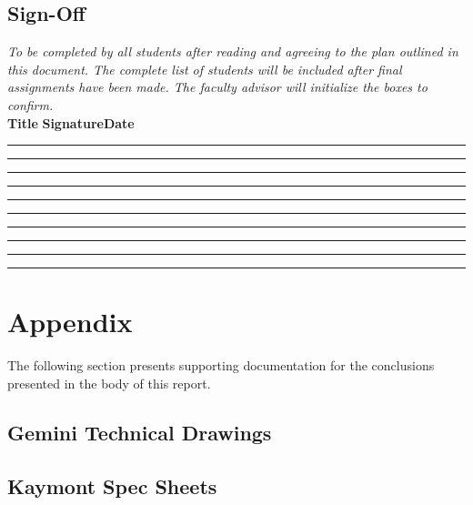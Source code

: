 \subsection{Sign-Off}
\textit{To be completed by all students after reading and agreeing to the plan outlined in this document. The complete list of students will be included after final assignments have been made. The faculty advisor will initialize the boxes to confirm.}
\vspace{.02cm}
\ \\

\textbf{Title} \tabto{20em}\textbf{Signature}\hspace{10em}\textbf{Date}
\begin{checklist}
    \item \pmgfull \tabto{20em}\rule{10em}{0.4pt}\hspace{5em}\rule{10em}{0.4pt}
    \item \tlfull  \tabto{20em}\rule{10em}{0.4pt}\hspace{5em}\rule{10em}{0.4pt}
    \item \tmfull  \tabto{20em}\rule{10em}{0.4pt}\hspace{5em}\rule{10em}{0.4pt}
    \item \sofull  \tabto{20em}\rule{10em}{0.4pt}\hspace{5em}\rule{10em}{0.4pt}
    \item \tcfull  \tabto{20em}\rule{10em}{0.4pt}\hspace{5em}\rule{10em}{0.4pt}
\end{checklist}
\setcounter{checklistnum}{0}

\newpage


\newpage
\section{Appendix}
The following section presents supporting documentation for the conclusions presented in the body of this report.

\renewcommand{\thesubsection}{\Alph{subsection}}

\subsection{Gemini Technical Drawings}
\label{appendix:GeminiDrawing}



\subsection{Kaymont Spec Sheets}
\label{appendix:Kaymont}




